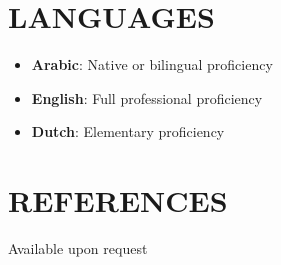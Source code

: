 \documentclass[paper=a4,fontsize=11pt]{scrartcl} %
\newcommand{\NewPart}[1]{\section*{\uppercase{#1}}}
\begin{document}
\NewPart{Languages}{}

\begin{itemize}
\item \textbf{Arabic}: Native or bilingual proficiency
\item \textbf{English}: Full professional proficiency
\item \textbf{Dutch}: Elementary proficiency
\end{itemize}


\NewPart{References}{}
Available upon request
\end{document}
